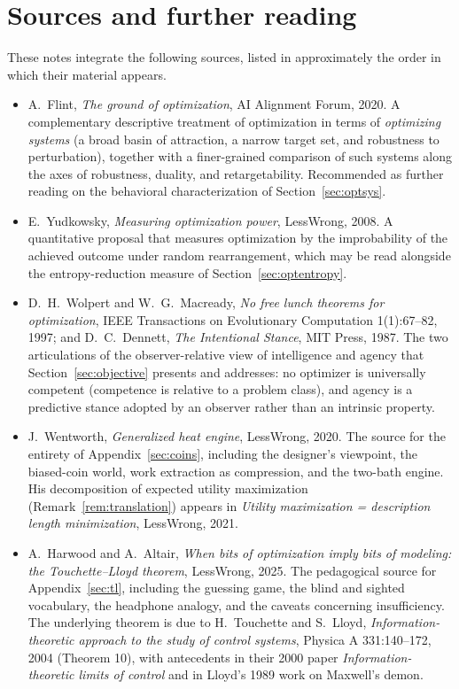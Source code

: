 \documentclass[10pt]{article}
\theoremstyle{definition}
\theoremstyle{remark}
\begin{document}
\section*{Sources and further reading}

These notes integrate the following sources, listed in approximately the order in which their material appears.

\begin{itemize}[leftmargin=2em]
  \item A.~Flint, \emph{The ground of optimization}, AI Alignment Forum, 2020. A complementary descriptive treatment of optimization in terms of \emph{optimizing systems} (a broad basin of attraction, a narrow target set, and robustness to perturbation), together with a finer-grained comparison of such systems along the axes of robustness, duality, and retargetability. Recommended as further reading on the behavioral characterization of Section~\ref{sec:optsys}.
  \item E.~Yudkowsky, \emph{Measuring optimization power}, LessWrong, 2008. A quantitative proposal that measures optimization by the improbability of the achieved outcome under random rearrangement, which may be read alongside the entropy-reduction measure of Section~\ref{sec:optentropy}.
  \item D.~H.~Wolpert and W.~G.~Macready, \emph{No free lunch theorems for optimization}, IEEE Transactions on Evolutionary Computation 1(1):67--82, 1997; and D.~C.~Dennett, \emph{The Intentional Stance}, MIT Press, 1987. The two articulations of the observer-relative view of intelligence and agency that Section~\ref{sec:objective} presents and addresses: no optimizer is universally competent (competence is relative to a problem class), and agency is a predictive stance adopted by an observer rather than an intrinsic property.
  \item J.~Wentworth, \emph{Generalized heat engine}, LessWrong, 2020. The source for the entirety of Appendix~\ref{sec:coins}, including the designer's viewpoint, the biased-coin world, work extraction as compression, and the two-bath engine. His decomposition of expected utility maximization (Remark~\ref{rem:translation}) appears in \emph{Utility maximization = description length minimization}, LessWrong, 2021.
  \item A.~Harwood and A.~Altair, \emph{When bits of optimization imply bits of modeling: the Touchette--Lloyd theorem}, LessWrong, 2025. The pedagogical source for Appendix~\ref{sec:tl}, including the guessing game, the blind and sighted vocabulary, the headphone analogy, and the caveats concerning insufficiency. The underlying theorem is due to H.~Touchette and S.~Lloyd, \emph{Information-theoretic approach to the study of control systems}, Physica A 331:140--172, 2004 (Theorem 10), with antecedents in their 2000 paper \emph{Information-theoretic limits of control} and in Lloyd's 1989 work on Maxwell's demon.

\end{itemize}
\end{document}
